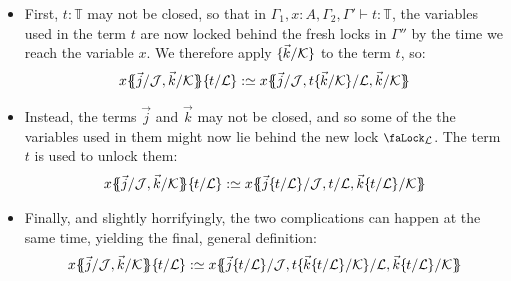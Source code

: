 \documentclass[10pt]{article}
\theoremstyle{definition}
\let\oldequiv\equiv%
\renewcommand{\equiv}{\simeq}
\newcommand{\defeq}{\oldequiv}
\newcommand{\yields}{\vdash}
\newcommand{\lock}{\mathchoice {\scalebox{0.8}{\text{\faLock}}}
  {\scalebox{0.8}{\text{\faLock}}} {\scalebox{0.5}{\text{\faLock}}}
  {\scalebox{0.4}{\text{\faLock}}} }
\newcommand{\Tiny}{\mathbb{T}}
\newcommand{\lockn}[1]{\mathcal{#1}}
\newcommand{\ctxlocke}[1]{\lock_{#1}}
\newcommand{\ctxlock}[1]{\ctxlocke{\lockn{#1}}}
\newcommand{\stubra}[1]{\{\!\!\{ #1 \}\!\!\}}
\newcommand{\admbra}[1]{\{\mkern-1mu #1 \mkern-0.5mu\}}
\newcommand{\subkeysep}[2]{#1/#2}
\newcommand{\subkeyo}[2]{\subkeysep{#1}{\lockn{#2}}}
\newcommand{\subkey}[2]{\admbra{\subkeyo{#1}{#2}}}
\begin{document}
\begin{itemize}
\item First, $t : \Tiny$ may not be closed, so that in
  $\Gamma_1, x : A, \Gamma_2, \Gamma' \yields t : \Tiny$, the
  variables used in the term $t$ are now locked behind the fresh locks
  in $\Gamma''$ by the time we reach the variable $x$. We therefore
  apply $\admbra{\subkeyo{\vec{k}}{K}}$ to the term $t$, so:
  \begin{align*}
    x \stubra{\subkeyo{\vec{j}}{J}, \subkeyo{\vec{k}}{K}} \subkey{t}{L}
    :\defeq 
    x \stubra{\subkeyo{\vec{j}}{J}, \subkeyo{t\subkey{\vec{k}}{K}}{L}, \subkeyo{\vec{k}}{K}}
  \end{align*}
\item Instead, the terms $\vec{j}$ and $\vec{k}$ may not be closed,
  and so some of the the variables used in them might now lie behind
  the new lock $\ctxlock{L}$. The term $t$ is used to unlock them:
  \begin{align*}
    x \stubra{\subkeyo{\vec{j}}{J}, \subkeyo{\vec{k}}{K}} \subkey{t}{L}
    :\defeq 
    x \stubra{\subkeyo{\vec{j}\subkey{t}{L}}{J}, \subkeyo{t}{L}, \subkeyo{\vec{k}\subkey{t}{L}}{K}}
  \end{align*}

\item Finally, and slightly horrifyingly, the two complications can happen
  at the same time, yielding the final, general definition:
  \begin{align*}
    x \stubra{\subkeyo{\vec{j}}{J}, \subkeyo{\vec{k}}{K}} \subkey{t}{L}
    :\defeq 
    x \stubra{\subkeyo{\vec{j}\subkey{t}{L}}{J}, \subkeyo{t\subkey{\vec{k}\subkey{t}{L}}{K}}{L}, \subkeyo{\vec{k}\subkey{t}{L}}{K}}
  \end{align*}
  

\end{itemize}
\end{document}
